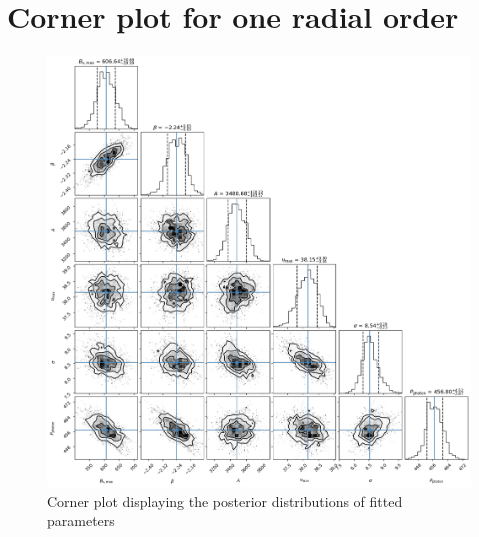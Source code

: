 \documentclass[12pt]{article}
\begin{document}
\section{Corner plot for one radial order}\label{a:A}
\begin{figure}[H]
  \centering
  \includegraphics[width=\linewidth]{corner_pds.png}
  \caption{Corner plot displaying the posterior distributions of fitted parameters}
  \label{fig:corner_powerExcess}
\end{figure}

\newpage
\end{document}
